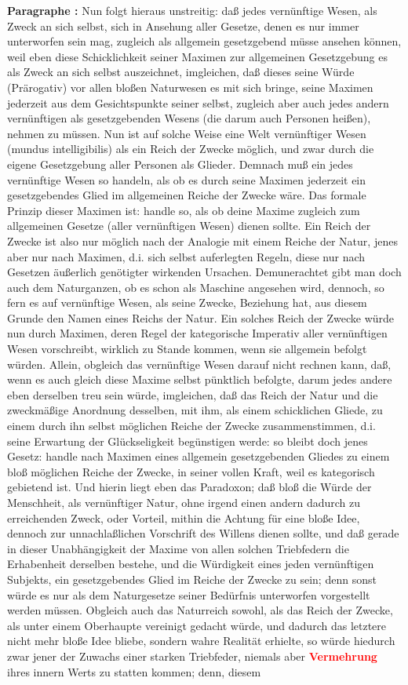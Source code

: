\documentclass[a4paper,12pt,twoside]{book}
\newcommand{\match}[1]{\textcolor{red}{\textbf{#1}}}
\begin{document}
	\noindent\textbf{Paragraphe : }Nun folgt hieraus unstreitig: daß jedes vernünftige Wesen, als Zweck an sich selbst, sich in Ansehung aller Gesetze, denen es nur immer unterworfen sein mag, zugleich als allgemein gesetzgebend müsse ansehen können, weil eben diese Schicklichkeit seiner Maximen zur allgemeinen Gesetzgebung es als Zweck an sich selbst auszeichnet, imgleichen, daß dieses seine Würde (Prärogativ) vor allen bloßen Naturwesen es mit sich bringe, seine Maximen jederzeit aus dem Gesichtspunkte seiner selbst, zugleich aber auch jedes andern vernünftigen als gesetzgebenden Wesens (die darum auch Personen heißen), nehmen zu müssen. Nun ist auf solche Weise eine Welt vernünftiger Wesen (mundus intelligibilis) als ein Reich der Zwecke möglich, und zwar durch die eigene Gesetzgebung aller Personen als Glieder. Demnach muß ein jedes vernünftige Wesen so handeln, als ob es durch seine Maximen jederzeit ein gesetzgebendes Glied im allgemeinen Reiche der Zwecke wäre. Das formale Prinzip dieser Maximen ist: handle so, als ob deine Maxime zugleich zum allgemeinen Gesetze (aller vernünftigen Wesen) dienen sollte. Ein Reich der Zwecke ist also nur möglich nach der Analogie mit einem Reiche der Natur, jenes aber nur nach Maximen, d.i. sich selbst auferlegten Regeln, diese nur nach Gesetzen äußerlich genötigter wirkenden Ursachen. Demunerachtet gibt man doch auch dem Naturganzen, ob es schon als Maschine angesehen wird, dennoch, so fern es auf vernünftige Wesen, als seine Zwecke, Beziehung hat, aus diesem Grunde den Namen eines Reichs der Natur. Ein solches Reich der Zwecke würde nun durch Maximen, deren Regel der kategorische Imperativ aller vernünftigen Wesen vorschreibt, wirklich zu Stande kommen, wenn sie allgemein befolgt würden. Allein, obgleich das vernünftige Wesen darauf nicht rechnen kann, daß, wenn es auch gleich  diese Maxime selbst pünktlich befolgte, darum jedes andere eben derselben treu sein würde, imgleichen, daß das Reich der Natur und die zweckmäßige Anordnung desselben, mit ihm, als einem schicklichen Gliede, zu einem durch ihn selbst möglichen Reiche der Zwecke zusammenstimmen, d.i. seine Erwartung der Glückseligkeit begünstigen werde: so bleibt doch jenes Gesetz: handle nach Maximen eines allgemein gesetzgebenden Gliedes zu einem bloß möglichen Reiche der Zwecke, in seiner vollen Kraft, weil es kategorisch gebietend ist. Und hierin liegt eben das Paradoxon; daß bloß die Würde der Menschheit, als vernünftiger Natur, ohne irgend einen andern dadurch zu erreichenden Zweck, oder Vorteil, mithin die Achtung für eine bloße Idee, dennoch zur unnachlaßlichen Vorschrift des Willens dienen sollte, und daß gerade in dieser Unabhängigkeit der Maxime von allen solchen Triebfedern die Erhabenheit derselben bestehe, und die Würdigkeit eines jeden vernünftigen Subjekts, ein gesetzgebendes Glied im Reiche der Zwecke zu sein; denn sonst würde es nur als dem Naturgesetze seiner Bedürfnis unterworfen vorgestellt werden müssen. Obgleich auch das Naturreich sowohl, als das Reich der Zwecke, als unter einem Oberhaupte vereinigt gedacht würde, und dadurch das letztere nicht mehr bloße Idee bliebe, sondern wahre Realität erhielte, so würde hiedurch zwar jener der Zuwachs einer starken Triebfeder, niemals aber \match{Vermehrung} ihres innern Werts zu statten kommen; denn, diesem 
\end{document}
